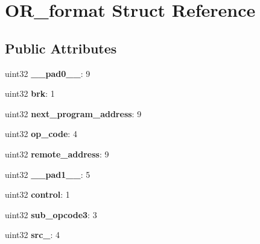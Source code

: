 \hypertarget{structOR__format}{}\section{O\+R\+\_\+format Struct Reference}
\label{structOR__format}
\subsection*{Public Attributes}
\begin{DoxyCompactItemize}
\item 
\mbox{\label{structOR__format_a92816b440cf0cd9934bd133ab4ed6a51}} 
uint32 {\bfseries \+\_\+\+\_\+pad0\+\_\+\+\_\+}\+: 9
\item 
\mbox{\label{structOR__format_a270d429abefe56425c067b1a9713f835}} 
uint32 {\bfseries brk}\+: 1
\item 
\mbox{\label{structOR__format_ade5276289d6c461b103baa08487ac2ea}} 
uint32 {\bfseries next\+\_\+program\+\_\+address}\+: 9
\item 
\mbox{\label{structOR__format_a17ab79429e30b3fefbb5b3434b4bd6e0}} 
uint32 {\bfseries op\+\_\+code}\+: 4
\item 
\mbox{\label{structOR__format_abc0fa55c85267a2c998003d6ea46761e}} 
uint32 {\bfseries remote\+\_\+address}\+: 9
\item 
\mbox{\label{structOR__format_a50f66473b786fd8a230b295d421cd1d9}} 
uint32 {\bfseries \+\_\+\+\_\+pad1\+\_\+\+\_\+}\+: 5
\item 
\mbox{\label{structOR__format_a909892fdef290765cef410d7498e2293}} 
uint32 {\bfseries control}\+: 1
\item 
\mbox{\label{structOR__format_afcbc6c185eb6508d6a9d4a1e4aee8e1b}} 
uint32 {\bfseries sub\+\_\+opcode3}\+: 3
\item 
\mbox{\label{structOR__format_a6668d2ce5f4307e26af574f3c636441e}} 
uint32 {\bfseries src\+\_}\+: 4
\item 
\mbox{\label{structOR__format_a1860ff8518387e41a9ca55a8456810ae}} 

\end{DoxyCompactItemize}
